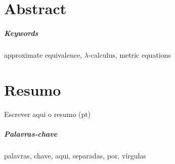 \chapter*{Abstract}

\begin{comment}
Noisy intermediate-scale quantum (NISQ)  computers are expected to operate with severely limited hardware resources. Precisely controlling qubits in these systems comes at a high cost, is susceptible to errors, and faces scarcity challenges. Therefore, error analysis is indispensable for the design, optimization, and assessment of NISQ computing. Nevertheless, the analysis of errors in quantum programs poses a significant challenge. The overarching goal of the M.Sc. project is to provide a fully-fledged
quantum programming language on which to study metric program equivalence
in various scenarios, such as in quantum algorithmics and quantum information theory.
\end{comment}


\paragraph{Keywords} approximate equivalence, $\lambda$-calculus, metric equations

\cleardoublepage

\chapter*{Resumo}

Escrever aqui o resumo (pt)

\paragraph{Palavras-chave} palavras, chave, aqui, separadas, por, vírgulas

\cleardoublepage
